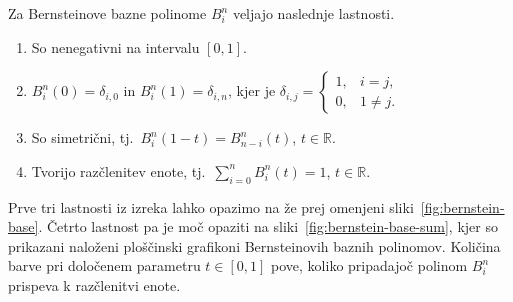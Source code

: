 \documentclass[isrm2, tisk]{fmfdelo}
\newcommand{\R}{\mathbb R}
\newcommand{\bernstein}[2]{\binom{#1}{#2}t^{#2}(1-t)^{#1-#2}}
\begin{document}
    \begin{izrek}
        Za Bernsteinove bazne polinome $B_i^n$ veljajo naslednje lastnosti.
        \label{izrek:bernsteinovi_lastnosti}
        \begin{enumerate}
            \item So nenegativni na intervalu $[0,1]$.\label{izrek:bernsteinovi_lastnosti:pozitivnost}
            \item $B_i^n(0) = \delta_{i,0}$ in $B_i^n(1) = \delta_{i,n}$, kjer je $\delta_{i,j} = \begin{cases}
                                                                                                      1, & i=j, \\
                                                                                                      0, & 1\neq j.
            \end{cases}$
            \item So simetrični, tj.\ $B_i^n(1-t) = B^n_{n-i}(t)$, $t\in\R$. \label{izrek:bernsteinovi_lastnosti:simetrija}
            \item Tvorijo razčlenitev enote, tj.\  $\sum_{i=0}^{n}B_{i}^{n}(t) = 1$, $t\in\R$.\label{izrek:bernsteinovi_lastnosti:enota}
        \end{enumerate}
    \end{izrek}
    \noindent Prve tri lastnosti iz izreka lahko opazimo na že prej omenjeni sliki~\ref{fig:bernstein-base}.
    Četrto lastnost pa je moč opaziti na sliki~\ref{fig:bernstein-base-sum}, kjer so prikazani naloženi ploščinski grafikoni Bernsteinovih baznih polinomov. %
    Količina barve pri določenem parametru $t\in[0,1]$ pove, koliko pripadajoč polinom $B_i^n$ prispeva k razčlenitvi enote.
\end{document}
